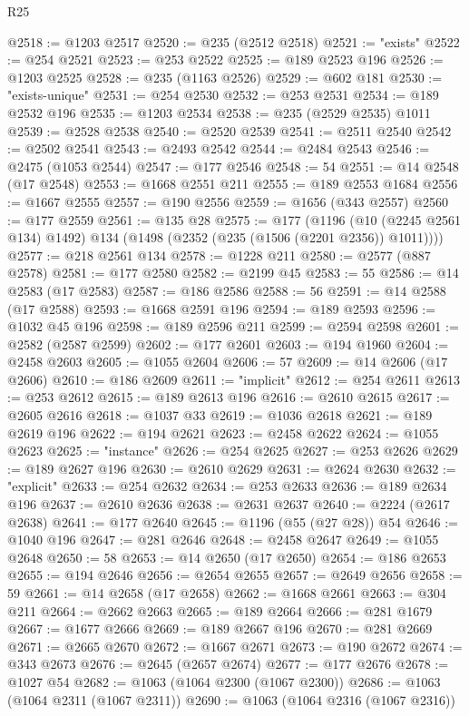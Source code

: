 \begin{lexlean}{R25}
\begin{coremodule}
@2518 := @1203 @2517
@2520 := @235 (@2512 @2518)
@2521 := "exists"
@2522 := @254 @2521
@2523 := @253 @2522
@2525 := @189 @2523 @196
@2526 := @1203 @2525
@2528 := @235 (@1163 @2526)
@2529 := @602 @181
@2530 := "exists-unique"
@2531 := @254 @2530
@2532 := @253 @2531
@2534 := @189 @2532 @196
@2535 := @1203 @2534
@2538 := @235 (@2529 @2535) @1011
@2539 := @2528 @2538
@2540 := @2520 @2539
@2541 := @2511 @2540
@2542 := @2502 @2541
@2543 := @2493 @2542
@2544 := @2484 @2543
@2546 := @2475 (@1053 @2544)
@2547 := @177 @2546
@2548 := 54
@2551 := @14 @2548 (@17 @2548)
@2553 := @1668 @2551 @211
@2555 := @189 @2553 @1684
@2556 := @1667 @2555
@2557 := @190 @2556
@2559 := @1656 (@343 @2557)
@2560 := @177 @2559
@2561 := @135 @28
@2575 := @177
    (@1196 (@10 (@2245 @2561 @134) @1492) @134 (@1498 (@2352 (@235 (@1506 (@2201 @2356)) @1011))))
@2577 := @218 @2561 @134
@2578 := @1228 @211
@2580 := @2577 (@887 @2578)
@2581 := @177 @2580
@2582 := @2199 @45
@2583 := 55
@2586 := @14 @2583 (@17 @2583)
@2587 := @186 @2586
@2588 := 56
@2591 := @14 @2588 (@17 @2588)
@2593 := @1668 @2591 @196
@2594 := @189 @2593
@2596 := @1032 @45 @196
@2598 := @189 @2596 @211
@2599 := @2594 @2598
@2601 := @2582 (@2587 @2599)
@2602 := @177 @2601
@2603 := @194 @1960
@2604 := @2458 @2603
@2605 := @1055 @2604
@2606 := 57
@2609 := @14 @2606 (@17 @2606)
@2610 := @186 @2609
@2611 := "implicit"
@2612 := @254 @2611
@2613 := @253 @2612
@2615 := @189 @2613 @196
@2616 := @2610 @2615
@2617 := @2605 @2616
@2618 := @1037 @33
@2619 := @1036 @2618
@2621 := @189 @2619 @196
@2622 := @194 @2621
@2623 := @2458 @2622
@2624 := @1055 @2623
@2625 := "instance"
@2626 := @254 @2625
@2627 := @253 @2626
@2629 := @189 @2627 @196
@2630 := @2610 @2629
@2631 := @2624 @2630
@2632 := "explicit"
@2633 := @254 @2632
@2634 := @253 @2633
@2636 := @189 @2634 @196
@2637 := @2610 @2636
@2638 := @2631 @2637
@2640 := @2224 (@2617 @2638)
@2641 := @177 @2640
@2645 := @1196 (@55 (@27 @28)) @54
@2646 := @1040 @196
@2647 := @281 @2646
@2648 := @2458 @2647
@2649 := @1055 @2648
@2650 := 58
@2653 := @14 @2650 (@17 @2650)
@2654 := @186 @2653
@2655 := @194 @2646
@2656 := @2654 @2655
@2657 := @2649 @2656
@2658 := 59
@2661 := @14 @2658 (@17 @2658)
@2662 := @1668 @2661
@2663 := @304 @211
@2664 := @2662 @2663
@2665 := @189 @2664
@2666 := @281 @1679
@2667 := @1677 @2666
@2669 := @189 @2667 @196
@2670 := @281 @2669
@2671 := @2665 @2670
@2672 := @1667 @2671
@2673 := @190 @2672
@2674 := @343 @2673
@2676 := @2645 (@2657 @2674)
@2677 := @177 @2676
@2678 := @1027 @54
@2682 := @1063 (@1064 @2300 (@1067 @2300))
@2686 := @1063 (@1064 @2311 (@1067 @2311))
@2690 := @1063 (@1064 @2316 (@1067 @2316))

\end{coremodule}
\end{lexlean}
